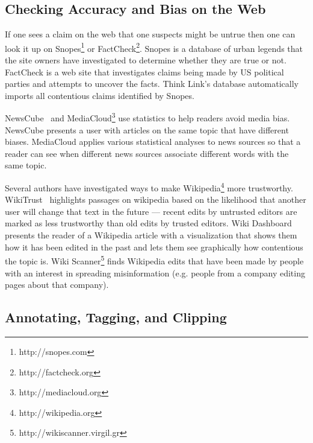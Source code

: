 \documentclass{chi2009}
\begin{document}
\subsection{Checking Accuracy and Bias on the Web}

If one sees a claim on the web that one suspects might be untrue then one can look it up on Snopes\footnote{http://snopes.com} or FactCheck\footnote{http://factcheck.org}. Snopes is a database of urban legends that the site owners have investigated to determine whether they are true or not. FactCheck is a web site that investigates claims being made by US political parties and attempts to uncover the facts. Think Link's database automatically imports all contentious claims identified by Snopes.

NewsCube~\cite{Park2009} and MediaCloud\footnote{http://mediacloud.org} use statistics to help readers avoid media bias. NewsCube presents a user with articles on the same topic that have different biases. MediaCloud applies various statistical analyses to news sources so that a reader can see when different news sources associate different words with the same topic.

Several authors have investigated ways to make Wikipedia\footnote{http://wikipedia.org} more trustworthy. WikiTrust~\cite{Adler2008} highlights passages on wikipedia based on the likelihood that another user will change that text in the future --- recent edits by untrusted editors are marked as less trustworthy than old edits by trusted editors. Wiki Dashboard~\cite{Kittur2008} presents the reader of a Wikipedia article with a visualization that shows them how it has been edited in the past and lets them see graphically how contentious the topic is. Wiki Scanner\footnote{http://wikiscanner.virgil.gr} finds Wikipedia edits that have been made by people with an interest in spreading misinformation (e.g. people from a company editing pages about that company).

% 
% 

\subsection{Annotating, Tagging, and Clipping}
\end{document}
